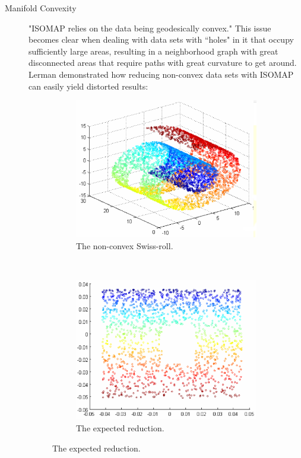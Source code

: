 \documentclass[12pt]{report}
\begin{document}
\begin{description}
	\item[Manifold Convexity] "ISOMAP relies on the data being geodesically convex." \cite{donoho2002does} This issue becomes clear when dealing with data sets with ``holes" in it that occupy sufficiently large areas, resulting in a neighborhood graph with great disconnected areas that require paths with great curvature to get around. Lerman demonstrated how reducing non-convex data sets with ISOMAP can easily yield distorted results: \cite{lerman2005}
	\begin{figure}[H]
		\centering
		\begin{subfigure}[H]{.45\linewidth}
			\includegraphics[width=\linewidth]{img/convexity/original.png}
			\captionsetup{justification=centering}
			\caption{The non-convex Swiss-roll.}
		\end{subfigure}
		~
		\begin{subfigure}[H]{.45\linewidth}
			\includegraphics[width=\linewidth]{img/convexity/expected.png}
			\captionsetup{justification=centering}
			\caption{The expected reduction.}
		\end{subfigure}
		\newline\newline


\end{figure}
\end{description}
\end{document}
